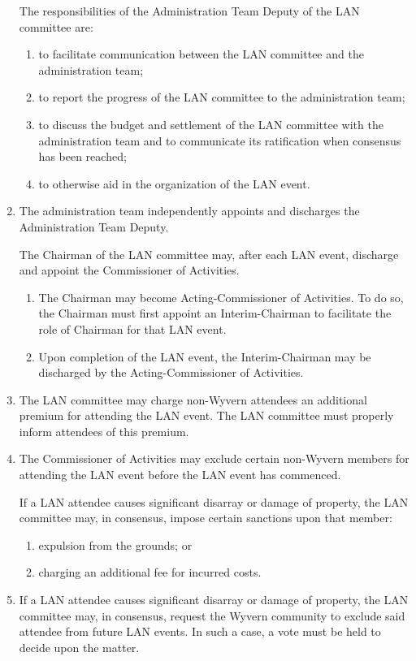 \begin{enumerate}
    \begin{item}
        The responsibilities of the Administration Team Deputy of the LAN committee are:
        \begin{enumerate}
            \item to facilitate communication between the LAN committee and the administration team;
            \item to report the progress of the LAN committee to the administration team;
            \item to discuss the budget and settlement of the LAN committee with the administration team and to communicate its ratification when consensus has been reached;
            \item to otherwise aid in the organization of the LAN event.
        \end{enumerate}
    \end{item}

    \item The administration team independently appoints and discharges the Administration Team Deputy.

    \begin{item}
        The Chairman of the LAN committee may, after each LAN event, discharge and appoint the Commissioner of Activities.
        \begin{enumerate}
            \item The Chairman may become Acting-Commissioner of Activities. To do so, the Chairman must first appoint an Interim-Chairman to facilitate the role of Chairman for that LAN event.
            \item Upon completion of the LAN event, the Interim-Chairman may be discharged by the Acting-Commissioner of Activities.
        \end{enumerate}
    \end{item}

    \item The LAN committee may charge non-Wyvern attendees an additional premium for attending the LAN event. The LAN committee must properly inform attendees of this premium.
    
    \item The Commissioner of Activities may exclude certain non-Wyvern members for attending the LAN event before the LAN event has commenced.
    
    \begin{item} If a LAN attendee causes significant disarray or damage of property, the LAN committee may, in consensus, impose certain sanctions upon that member:
        \begin{enumerate}
            \item expulsion from the grounds; or
            \item charging an additional fee for incurred costs.
        \end{enumerate}
    \end{item}
    
    \item If a LAN attendee causes significant disarray or damage of property, the LAN committee may, in consensus, request the Wyvern community to exclude said attendee from future LAN events. In such a case, a vote must be held to decide upon the matter.

\end{enumerate}
